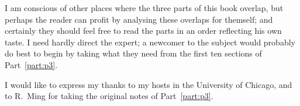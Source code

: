 \documentclass[main]{subfiles}
\begin{document}
I am conscious of other places where the three parts of this book overlap, but perhaps the reader can profit by analysing these overlaps for themself; and certainly they should feel free to read the parts in an order reflecting his own taste. 
I need hardly direct the expert; a newcomer to the subject would probably do best to begin by taking what they need from the first ten sections of Part~\ref{part:p3}.

I would like to express my thanks to my hosts in the University of Chicago, and to R.~Ming for taking the original notes of Part~\ref{part:p3}.
\end{document}
